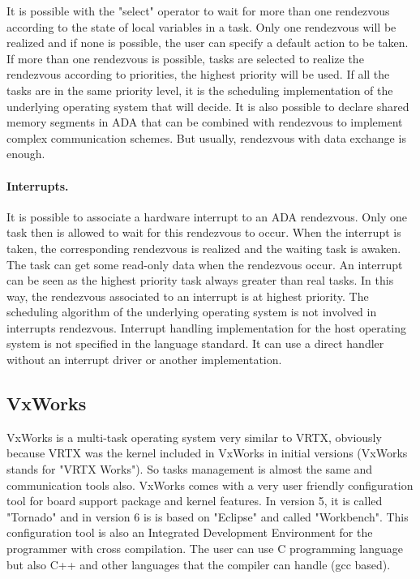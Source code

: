 \documentclass[10pt]{report}
\begin{document}
It is possible with the "select" operator to wait for more than one rendezvous according to the state of local variables in a task.
Only one rendezvous will be realized and if none is possible, the user can specify a default action to be taken. If more than
one rendezvous is possible, tasks are selected to realize the rendezvous according to priorities, the highest priority will be
used. If all the tasks are in the same priority level, it is the scheduling implementation of the underlying operating system
that will decide. It is also possible to declare shared memory segments in ADA that can be combined with rendezvous to
implement complex communication schemes. But usually, rendezvous with data exchange is enough.

\paragraph{Interrupts.} It is possible to associate a hardware interrupt to an ADA rendezvous. Only one task then is allowed
to wait for this rendezvous to occur. When the interrupt is taken, the corresponding rendezvous is realized and the waiting
task is awaken. The task can get some read-only data when the rendezvous occur. An interrupt can be seen as the highest
priority task always greater than real tasks. In this way, the rendezvous associated to an interrupt is at highest priority.
The scheduling algorithm of the underlying operating system is not involved in interrupts rendezvous. Interrupt handling
implementation for the host operating system is not specified in the language standard. It can use a direct handler without
an interrupt driver or another implementation.

\subsection{VxWorks}

VxWorks is a multi-task operating system very similar to VRTX, obviously because VRTX was the kernel included in VxWorks in
initial versions (VxWorks stands for "VRTX Works"). So tasks management is almost the same and communication tools also.
VxWorks comes with a very user friendly configuration tool for board support package and kernel features. In version 5, it is
called "Tornado" and in version 6 is is based on "Eclipse" and called "Workbench". This configuration tool is also an
Integrated Development Environment for the programmer with cross compilation. The user can use C programming language but also
C++ and other languages that the compiler can handle (gcc based).
\end{document}
